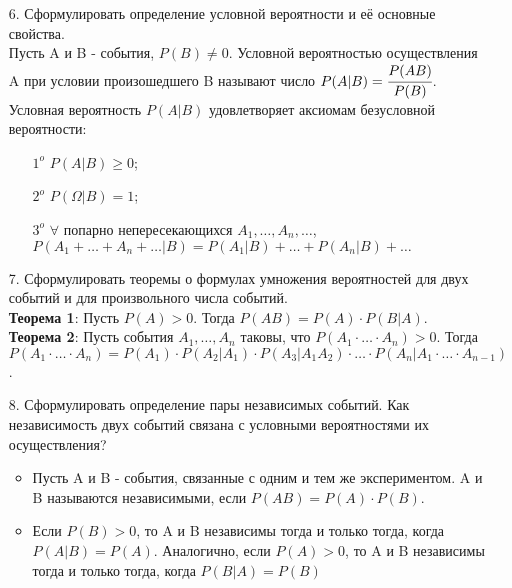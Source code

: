 \documentclass[a4paper]{article}
\begin{document}
\begin{enumerate}
\item[6.] Сформулировать определение условной вероятности и её основные свойства. \\
Пусть A и B - события, $P(B) \neq 0$. Условной вероятностью осуществления A при условии произошедшего B называют число $P(A|B) = \cfrac{P(AB)}{P(B)}$. \\
Условная вероятность $P(A|B)$ удовлетворяет аксиомам безусловной вероятности: \\
	\begin{enumerate}
	\item[$1^o$] $P(A|B) \geqslant 0$;
	\item[$2^o$] $P(\Omega|B) = 1$;
	\item[$3^o$] $\forall$ попарно непересекающихся $A_1, \ldots, A_n, \ldots$,  $P(A_1 + \ldots + A_n + \ldots|B) = P(A_1|B) + \ldots +P(A_n|B) + \ldots$
	\end{enumerate}



\item[7.] Сформулировать теоремы о формулах умножения вероятностей для двух событий и для произвольного числа событий. \\
\textbf{Теорема 1}: Пусть $P(A) > 0$. Тогда $P(AB) = P(A) \cdot P(B|A)$. \\
\textbf{Теорема 2}: Пусть события $A_1, \ldots, A_n$ таковы, что $P(A_1 \cdot \ldots \cdot A_n) > 0$. Тогда $P(A_1 \cdot \ldots \cdot A_n) = P(A_1) \cdot P(A_2|A_1) \cdot P(A_3|A_1 A_2) \cdot \ldots \cdot P(A_n|A_1 \cdot \ldots \cdot A_{n-1})$. 



\item[8.]Сформулировать определение пары независимых событий. Как независимость двух событий связана с условными вероятностями их осуществления? \\
\begin{itemize}
\item Пусть A и B - события, связанные с одним и тем же экспериментом. A и B называются независимыми, если $P(AB) = P(A) \cdot P(B)$. 
\item Если $P(B) > 0$, то A и B независимы тогда и только тогда, когда $P(A|B) = P(A)$. Аналогично, если $P(A) > 0$, то A и B независимы тогда и только тогда, когда $P(B|A) = P(B)$
\end{itemize}




\end{enumerate}
\end{document}
